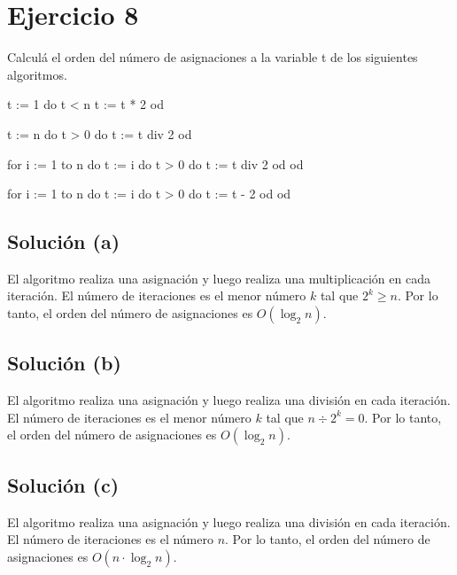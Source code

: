\documentclass{article}
\begin{document}
\section{Ejercicio 8}
Calculá el orden del número de asignaciones a la variable t de los siguientes algoritmos.

\begin{codebox}
\begin{pascallike}
t := 1
do t < n 
    t := t * 2
od
\end{pascallike}
\end{codebox}

\begin{codebox}
\begin{pascallike}
t := n
do t > 0 do
    t := t div 2
od
\end{pascallike}
\end{codebox}

\begin{codebox}
\begin{pascallike}
for i := 1 to n do
    t := i
    do t > 0 do
    t := t div 2
    od
od
\end{pascallike} 
\end{codebox}

\begin{codebox}
\begin{pascallike}
for i := 1 to n do
    t := i
    do t > 0 do
    t := t - 2
    od
od
\end{pascallike}
\end{codebox}

\subsection{Solución (a)}
El algoritmo realiza una asignación y luego realiza una multiplicación en cada iteración. El número de iteraciones es el menor número $k$ tal que $2^k \geq n$. Por lo tanto, el orden del número de asignaciones es $O(\log_2 n)$.

\subsection{Solución (b)}
El algoritmo realiza una asignación y luego realiza una división en cada iteración. El número de iteraciones es el menor número $k$ tal que $n \div 2^k = 0$. Por lo tanto, el orden del número de asignaciones es $O(\log_2 n)$.

\subsection{Solución (c)}
El algoritmo realiza una asignación y luego realiza una división en cada iteración. El número de iteraciones es el número $n$. Por lo tanto, el orden del número de asignaciones es $O(n \cdot \log_2 n)$.
\end{document}
